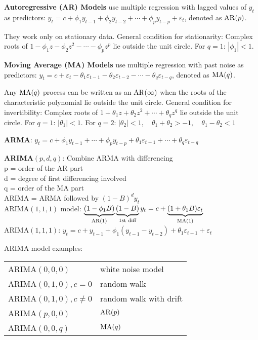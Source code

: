 \begin{minipage}[t]{0.49\textwidth}
\textbf{Autoregressive (AR) Models} use multiple regression with lagged values of $ y_t $ as predictors:
$ y_t = c + \phi_1 y_{t-1} + \phi_2 y_{t-2} + \cdots + \phi_p y_{t-p} + \varepsilon_t $, denoted as \(\operatorname{AR}(p)\).

They work only on stationary data. General condition for stationarity:
Complex roots of \(1 - \phi_1z - \phi_2z^2 - \cdots - \phi_p z^p\) lie outside the unit circle.
For \(q=1\): \(|\phi_1| < 1\).

\vspace{2mm}
\textbf{Moving Average (MA) Models} use multiple regression with past noise as predictors:
$ y_t = c + \varepsilon_t - \theta_1 \varepsilon_{t-1} - \theta_2 \varepsilon_{t-2} - \cdots - \theta_q \varepsilon_{t-q} $, denoted as \(\operatorname{MA}(q)\).

Any $ \operatorname{MA}(q) $ process can be written as an $ \operatorname{AR}(\infty) $ when the roots of the characteristic polynomial lie outside the unit circle.
General condition for invertibility:
Complex roots of \(1 + \theta_1z + \theta_2z^2 + \cdots + \theta_q z^q\) lie outside the unit circle.
For \(q=1\): \(|\theta_1| < 1\).
For \(q=2\): \(|\theta_2| < 1,\quad \theta_1 + \theta_2 > -1,\quad \theta_1-\theta_2 < 1\)
\end{minipage}
\hfill
\begin{minipage}[t]{0.49\textwidth}
\textbf{ARMA}: \(y_t = c + \phi_1 y_{t-1} + \cdots + \phi_p y_{t-p} +
\theta_1 \varepsilon_{t-1} + \cdots + \theta_q \varepsilon_{t-q}\)

\textbf{ARIMA}\((p,d,q)\): Combine ARMA with differencing\\
p = order of the AR part\\
d = degree of first differencing involved\\
q = order of the MA part\\
ARIMA = ARMA followed by \((1-B)^d y_t\)\\
ARIMA\((1,1,1)\) model:
\(\underbrace{(1-\phi_1B)}_{\operatorname{AR}(1)} \underbrace{(1-B)}_{\text{1st diff}}y_t = c + \underbrace{(1 + \theta_1B)\varepsilon_t}_{\operatorname{MA}(1)}\)\\
ARIMA\((1,1,1)\): \( y_t = c + y_{t-1} + \phi_1(y_{t-1} - y_{t-2}) + \theta_1 \varepsilon_{t-1} + \varepsilon_t\)

\vspace{2mm}
ARIMA model examples:\\
\begin{tabular}{ll}
    ARIMA\((0, 0, 0)\) & white noise model\\
    ARIMA\((0, 1, 0), c=0\) & random walk\\
    ARIMA\((0, 1, 0), c\ne0\) & random walk with drift\\
    ARIMA\((p, 0, 0)\) & \(\operatorname{AR}(p)\)\\
    ARIMA\((0, 0, q)\) & \(\operatorname{MA}(q)\)
\end{tabular}
\end{minipage}
